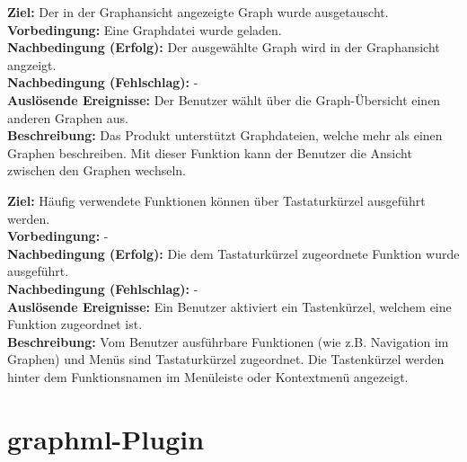 \label{fa:graphwechsel}
\textbf{Ziel:} Der in der Graphansicht angezeigte Graph wurde ausgetauscht. \\
\textbf{Vorbedingung:} Eine Graphdatei wurde geladen.\\
\textbf{Nachbedingung (Erfolg):} Der ausgewählte Graph wird in der Graphansicht angzeigt.\\
\textbf{Nachbedingung (Fehlschlag):} -\\
\textbf{Auslösende Ereignisse:}
Der Benutzer wählt über die Graph-Übersicht einen anderen Graphen aus.\\
\textbf{Beschreibung:}
Das Produkt unterstützt Graphdateien, welche mehr als einen Graphen beschreiben.
Mit dieser Funktion kann der Benutzer die Ansicht zwischen den Graphen wechseln.

\label{fa:hotkey}
\textbf{Ziel:} Häufig verwendete Funktionen können über Tastaturkürzel ausgeführt werden.\\
\textbf{Vorbedingung:} -\\
\textbf{Nachbedingung (Erfolg):} Die dem Tastaturkürzel zugeordnete Funktion wurde ausgeführt.\\
\textbf{Nachbedingung (Fehlschlag):} -\\
\textbf{Auslösende Ereignisse:}
Ein Benutzer aktiviert ein Tastenkürzel, welchem eine Funktion zugeordnet ist.\\
\textbf{Beschreibung:}
Vom Benutzer ausführbare Funktionen (wie z.B. Navigation im Graphen) und Menüs sind Tastaturkürzel zugeordnet.
Die Tastenkürzel werden hinter dem Funktionsnamen im Menüleiste oder Kontextmenü angezeigt.

\section{\gls{graphml}-Plugin}

